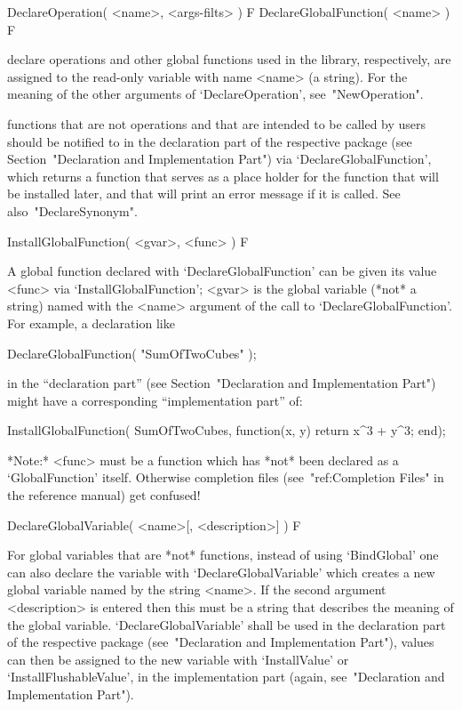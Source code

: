 \>DeclareOperation( <name>, <args-filts> ) F
\>DeclareGlobalFunction( <name> ) F

declare operations and other global functions used in the {\GAP} library,
respectively,
are assigned to the read-only variable with name <name> (a string).
For the meaning of the other arguments of `DeclareOperation',
see~"NewOperation".

{\GAP} functions that are not operations and that are intended to be
called by users should be notified to {\GAP} in the declaration part
of the respective package
(see Section~"Declaration and Implementation Part")
via `DeclareGlobalFunction', which returns a function that serves as a
place holder for the function that will be installed later,
and that will print an error message if it is called.
See also~"DeclareSynonym".

\>InstallGlobalFunction( <gvar>, <func> ) F

A global function declared with `DeclareGlobalFunction' can be given its
value <func> via `InstallGlobalFunction'; 
<gvar> is the global variable (*not* a string) named with the 
<name> argument of the call to `DeclareGlobalFunction'. For example,
a declaration like

\begintt
DeclareGlobalFunction( "SumOfTwoCubes" );
\endtt

in the ``declaration part'' (see Section~"Declaration and Implementation
Part") might have a corresponding ``implementation part'' of:

\begintt
InstallGlobalFunction( SumOfTwoCubes, function(x, y) return x^3 + y^3; end);
\endtt

*Note:* <func> must be a function which has *not* been declared as a
`GlobalFunction' itself. Otherwise completion files
(see~"ref:Completion Files" in the reference manual) get confused!

\>DeclareGlobalVariable( <name>[, <description>] ) F

For global variables that are *not* functions,
instead of using `BindGlobal' one can also declare the variable with
`DeclareGlobalVariable' 
which creates a new global variable named by the string <name>.
If the second argument <description> is entered then this must be
a string that describes the meaning of the global variable.
`DeclareGlobalVariable' shall be used in the declaration part of the
respective package (see~"Declaration and Implementation Part"),
values can then be assigned to the new variable with `InstallValue' or
`InstallFlushableValue', in the implementation part
(again, see~"Declaration and Implementation Part").

